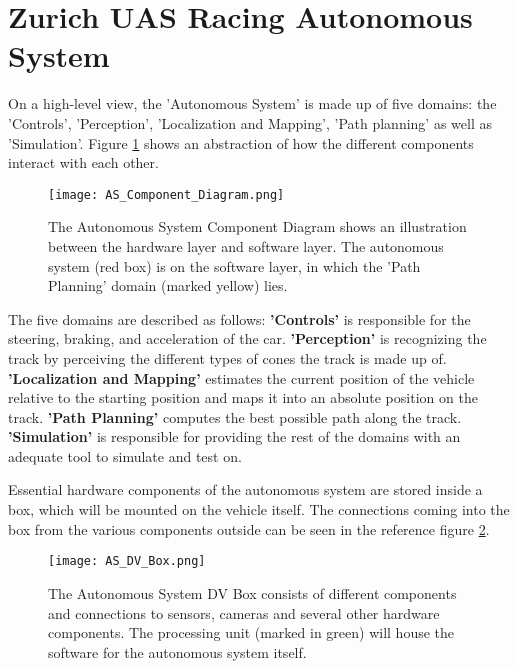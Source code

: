 \section{Zurich UAS Racing Autonomous System} \label{sec:Zurich UAS Racing Autonomous System}
On a high-level view, the 'Autonomous System' is made up of five domains: the 'Controls', 'Perception', 'Localization and Mapping', 'Path planning' as well as 'Simulation'. Figure \ref{fig:AS Component Diagram} shows an abstraction of how the different components interact with each other. %
\begin{figure}[H]
    \centering
    \texttt{[image: AS\_Component\_Diagram.png]}
    \caption{The Autonomous System Component Diagram shows an illustration between the hardware layer and software layer. The autonomous system (red box) is on the software layer, in which the 'Path Planning' domain (marked yellow) lies.}
    \label{fig:AS Component Diagram}
\end{figure}
The five domains are described as follows:
\textbf{'Controls'} is responsible for the steering, braking, and acceleration of the car.
\textbf{'Perception'} is recognizing the track by perceiving the different types of cones the track is made up of.
\textbf{'Localization and Mapping'} estimates the current position of the vehicle relative to the starting position and maps it into an absolute position on the track.
\textbf{'Path Planning'} computes the best possible path along the track.
\textbf{'Simulation'} is responsible for providing the rest of the domains with an adequate tool to simulate and test on.

Essential hardware components of the autonomous system are stored inside a box, which will be mounted on the vehicle itself. The connections coming into the box from the various components outside can be seen in the reference figure \ref{fig:AS DV Box}. %

\begin{figure}[H]
    \centering
    \texttt{[image: AS\_DV\_Box.png]}
    \caption{The Autonomous System DV Box consists of different components and connections to sensors, cameras and several other hardware components. The processing unit (marked in green) will house the software for the autonomous system itself.}
    \label{fig:AS DV Box}
\end{figure}

